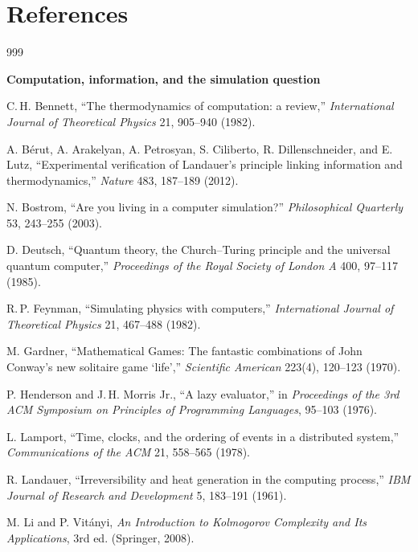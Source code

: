 \chapter*{References}

\begin{thebibliography}{999}

\item[] \textbf{Computation, information, and the simulation question}

 C.\,H. Bennett, ``The thermodynamics of computation: a review,'' \textit{International Journal of Theoretical Physics} 21, 905--940 (1982).

 A. B\'erut, A. Arakelyan, A. Petrosyan, S. Ciliberto, R. Dillenschneider, and E. Lutz, ``Experimental verification of Landauer's principle linking information and thermodynamics,'' \textit{Nature} 483, 187--189 (2012).

 N. Bostrom, ``Are you living in a computer simulation?'' \textit{Philosophical Quarterly} 53, 243--255 (2003).

 D. Deutsch, ``Quantum theory, the Church--Turing principle and the universal quantum computer,'' \textit{Proceedings of the Royal Society of London A} 400, 97--117 (1985).

 R.\,P. Feynman, ``Simulating physics with computers,'' \textit{International Journal of Theoretical Physics} 21, 467--488 (1982).

 M. Gardner, ``Mathematical Games: The fantastic combinations of John Conway's new solitaire game `life','' \textit{Scientific American} 223(4), 120--123 (1970).

 P. Henderson and J.\,H. Morris Jr., ``A lazy evaluator,'' in \textit{Proceedings of the 3rd ACM Symposium on Principles of Programming Languages}, 95--103 (1976).

 L. Lamport, ``Time, clocks, and the ordering of events in a distributed system,'' \textit{Communications of the ACM} 21, 558--565 (1978).

 R. Landauer, ``Irreversibility and heat generation in the computing process,'' \textit{IBM Journal of Research and Development} 5, 183--191 (1961).

 M. Li and P. Vit\'anyi, \textit{An Introduction to Kolmogorov Complexity and Its Applications}, 3rd ed. (Springer, 2008).


\end{thebibliography}

